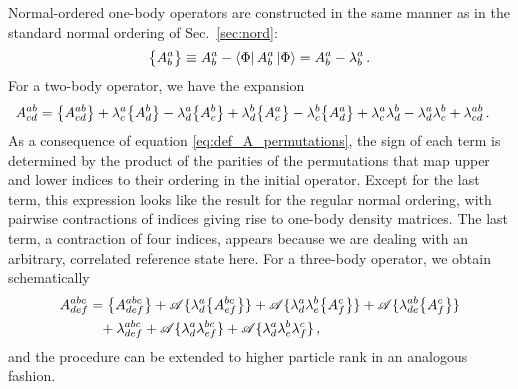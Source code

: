 {Normal-ordered one-body operators are constructed in the same manner as in
the standard normal ordering of Sec.~\ref{sec:nord}:
\begin{equation}
  \big\{A^{a}_{b}\big\} \equiv A^{a}_{b} - \langle{\Phi}|\,{A^{a}_{b}}\,|{\Phi}\rangle = A^{a}_{b} - \lambda^{a}_{b}\,.
\end{equation}
For a two-body operator, we have the expansion
\begin{align}
  A^{ab}_{cd} &= \nord{A^{ab}_{cd}} 
                  + \lambda^{a}_{c}\nord{A^{b}_{d}} 
                  - \lambda^{a}_{d}\nord{A^{b}_{c}} 
                  + \lambda^{b}_{d}\nord{A^{a}_{c}}
                  - \lambda^{b}_{c}\nord{A^{a}_{d}}
                  + \lambda^{a}_{c}\lambda^{b}_{d}
                  - \lambda^{a}_{d}\lambda^{b}_{c}
                  + \lambda^{ab}_{cd}\,.\label{eq:nord_2B}
\end{align}
As a consequence of equation \eqref{eq:def_A_permutations}, the sign of each
term is determined by the product of the parities of the permutations 
that map upper and lower indices to their ordering in the initial operator. 
Except for the last term, this expression looks like the result for the
regular normal ordering, with pairwise contractions of indices giving
rise to one-body density matrices. The last term, a contraction
of four indices, appears because we are dealing with an arbitrary, 
correlated reference state here. For a three-body operator, we 
obtain schematically
\begin{align}
  A^{abc}_{def} &= \big\{A^{abc}_{def}\big\} 
                  + \mathcal{A}\{\lambda^{a}_{d}\big\{A^{bc}_{ef}\big\} \}
                  + \mathcal{A}\{\lambda^{a}_{d}\lambda^{b}_{e}\big\{A^{c}_{f}\big\} \}
                  + \mathcal{A}\{\lambda^{ab}_{de}\big\{A^{c}_{f}\big\} \} \notag\\
                &\hphantom{=} + \lambda^{abc}_{def}
                  + \mathcal{A}\{\lambda^{a}_{d}\lambda^{bc}_{ef} \}
                  + \mathcal{A}\{\lambda^{a}_{d}\lambda^{b}_{e}\lambda^{c}_{f} \}\,,
\end{align}
and the procedure can be extended to higher particle rank in an
analogous fashion.

}
